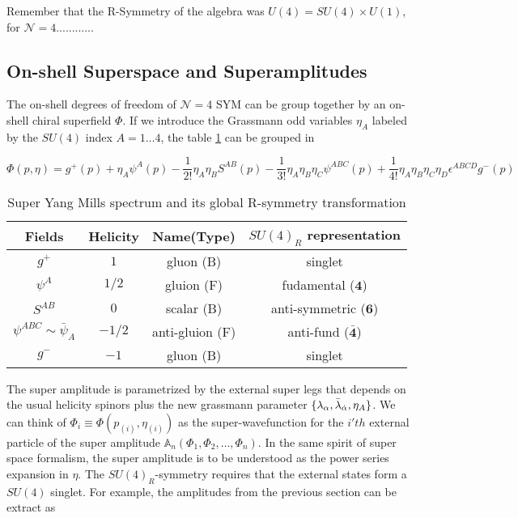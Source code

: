 Remember that the R-Symmetry of the algebra was $U(4) =SU(4) \times U(1) $, for $\mathcal{N} =4$............


\subsection{On-shell Superspace and Superamplitudes}




The on-shell degrees of freedom of $\mathcal{N} =4$ SYM can be group together by an on-shell chiral superfield $\Phi$. If we introduce the Grassmann odd variables $\eta_{A}$ labeled by the $SU(4)$ index $A = 1 \dots 4$, the table \ref{Tb.2.2} can be grouped  in


\begin{equation}
\Phi(p,\eta)= g^{+}(p) + \eta_{A}\psi^{A}(p) - \frac{1}{2!}\eta_{A}\eta_{B}S^{AB}(p) -\frac{1}{3!}\eta_{A}\eta_{B}\eta_{C}\psi^{ABC}(p) + \frac{1}{4!}\eta_{A}\eta_{B}\eta_{C}\eta_{D}\epsilon^{ABCD}g^{-}(p)
\end{equation}

  \begin{table}[h!]
  \centering
  \begin{tabular}{ |c|c|c|c| } 
   \hline
    Fields  		& Helicity 	& Name(Type)	 		& $SU(4)_{R}$ representation \\
   \hline
   $g^{+}$			& $1$ 		& gluon   	(B)		& singlet					\\
   $\psi^{A}$ 	   	& $1/2$ 	& gluion 	(F)		& fudamental ($\mathbf{4}$)				\\ 
   $S^{AB}$ 	 	& $0$ 		& scalar 	(B)		&	anti-symmetric ($\mathbf{6}$)		\\ 
   $\psi^{ABC} \sim \bar{\psi}_{A} $ 	& $-1/2$ 	& anti-gluion (F)	&  anti-fund ($\bar{\mathbf{4}}$)		\\ 
   $g^{-}$ 			& $-1$ 		& gluon 	(B)	&	singlet 				\\ 
 \hline
  \end{tabular}
  \caption{Super Yang Mills spectrum and its global R-symmetry transformation }
  \label{Tb.2.2}
	\end{table}
	


The super amplitude is parametrized by the external super legs that depends on the usual helicity spinors plus the new grassmann parameter $\{\lambda_{\alpha},\bar{\lambda}_{\dot{\alpha}},\eta_{A}\}$. We can think of $\Phi_{i}\equiv\Phi(p_{(i)},\eta_{(i)})$ as the super-wavefunction for the $i'th$ external particle of the super amplitude $\mathbb{A}_{n}(\Phi_{1},\Phi_{2},\dots , \Phi_{n})$. In the same spirit of  super space formalism, the super amplitude is to be understood as the power series expansion in $\eta$. The $SU(4)_{R}$-symmetry requires that the external states form a  $SU(4)$ singlet. For example, the  amplitudes from the previous section can be extract as




